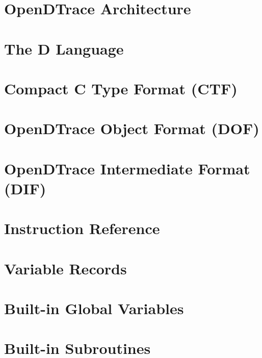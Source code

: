\chapter{OpenDTrace Architecture}
\label{chap:opendtrace-arch}


\chapter{The D Language}
\label{chap:opendtrace-dlang}


\chapter{Compact C Type Format (CTF)}
\label{chap:opendtrace-ctf}


\chapter{OpenDTrace Object Format (DOF)}
\label{chap:opendtrace-object-format}


\chapter{OpenDTrace Intermediate Format (DIF)}
\label{chap:opendtrace-intermediate-format}


\chapter{Instruction Reference}
\label{chap:opendtrace-instruction-reference}


\chapter{Variable Records}
\label{chap:opendtrace-variable-records}


\chapter{Built-in Global Variables}
\label{chap:opendtrace-global-vars}


\chapter{Built-in Subroutines}
\label{chap:opendtrace-subroutines}


